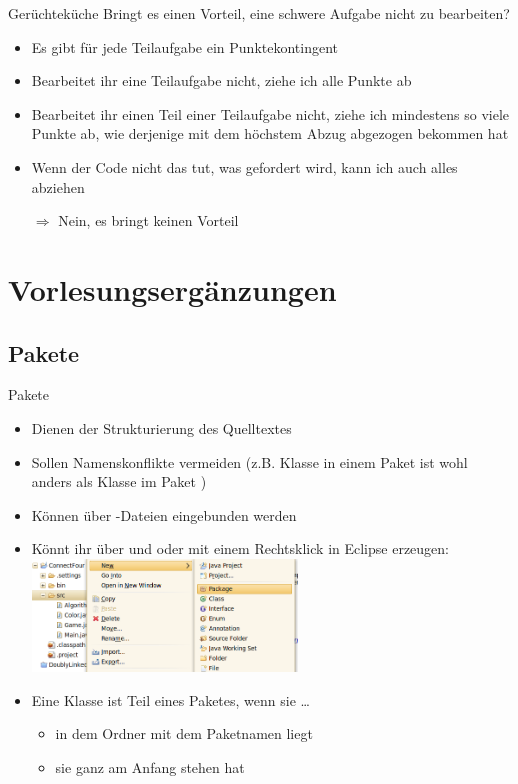 \documentclass[usepdftitle=false,hyperref={pdfpagelabels=false}]{beamer}
\begin{document}
\begin{frame}{Gerüchteküche}
  Bringt es einen Vorteil, eine schwere Aufgabe nicht zu bearbeiten?
  \begin{itemize}[<+->]
    \item Es gibt für jede Teilaufgabe ein Punktekontingent
    \item Bearbeitet ihr eine Teilaufgabe nicht, ziehe ich alle Punkte ab
    \item Bearbeitet ihr einen Teil einer Teilaufgabe nicht, ziehe 
          ich mindestens so viele Punkte ab, wie derjenige mit dem 
          höchstem Abzug abgezogen bekommen hat
    \item Wenn der Code nicht das tut, was gefordert wird, kann ich 
          auch alles abziehen
    \item[$\Rightarrow$] Nein, es bringt keinen Vorteil
  \end{itemize}
\end{frame}

\section{Vorlesungsergänzungen}
\subsection{Pakete}
\begin{frame}{Pakete}
    \begin{itemize}[<+->]
      \item Dienen der Strukturierung des Quelltextes
      \item Sollen Namenskonflikte vermeiden (z.B. Klasse 
            in einem Paket  ist wohl anders als Klasse
             im Paket )
      \item Können über -Dateien eingebunden werden
      \item Könnt ihr über  und 
            oder mit einem Rechtsklick in Eclipse erzeugen:
        \includegraphics[height=30mm]{new-package.png}\\
      \item Eine Klasse ist Teil eines Paketes, wenn sie \dots
        \begin{itemize}
            \item in dem Ordner mit dem Paketnamen liegt
            \item sie  ganz am Anfang stehen hat
        \end{itemize}
    \end{itemize}
\end{frame}
\end{document}
